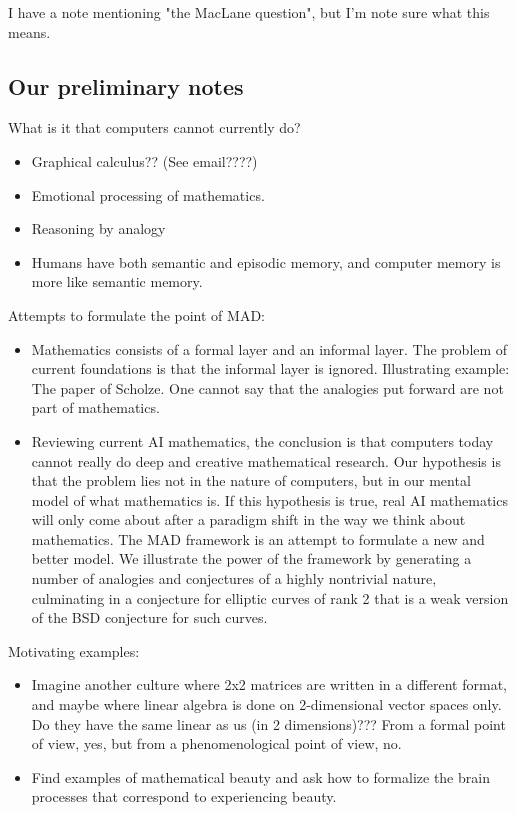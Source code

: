 I have a note mentioning "the MacLane question", but I'm note sure what this means.

\subsection{Our preliminary notes}

What is it that computers cannot currently do?
\begin{itemize}
\item Graphical calculus?? (See email????)

\item Emotional processing of mathematics.

\item Reasoning by analogy

\item Humans have both semantic and episodic memory, and computer memory is more like semantic memory.

\end{itemize}

Attempts to formulate the point of MAD:

\begin{itemize}
\item Mathematics consists of a formal layer and an informal layer. The problem of current foundations is that the informal layer is ignored. Illustrating example: The paper of Scholze. One cannot say that the analogies put forward are not part of mathematics.
\item Reviewing current AI mathematics, the conclusion is that computers today cannot really do deep and creative mathematical research. Our hypothesis is that the problem lies not in the nature of computers, but in our mental model of what mathematics is. If this hypothesis is true, real AI mathematics will only come about after a paradigm shift in the way we think about mathematics. The MAD framework is an attempt to formulate a new and better model. We illustrate the power of the framework by generating a number of analogies and conjectures of a highly nontrivial nature, culminating in a conjecture for elliptic curves of rank 2 that is a weak version of the BSD conjecture for such curves.

\end{itemize}

Motivating examples:
\begin{itemize}
\item Imagine another culture where 2x2 matrices are written in a different format, and maybe where linear algebra is done on 2-dimensional vector spaces only. Do they have the same linear as us (in 2 dimensions)??? From a formal point of view, yes, but from a phenomenological point of view, no.
\item Find examples of mathematical beauty and ask how to formalize the brain processes that correspond to experiencing beauty.
\end{itemize}

